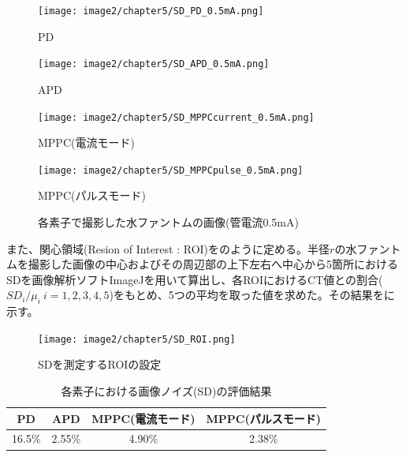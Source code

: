 \begin{figure}[H]
 \begin{minipage}{0.5\hsize}
  \begin{center}
   \texttt{[image: image2/chapter5/SD\_PD\_0.5mA.png]} 
  \end{center}
  \vspace{-1cm}
  \caption*{PD}
 \end{minipage}
 \begin{minipage}{0.5\hsize}
  \begin{center}
 \texttt{[image: image2/chapter5/SD\_APD\_0.5mA.png]} 
  \end{center}
  \vspace{-1cm}
  \caption*{APD}
 \end{minipage}
  \begin{minipage}{0.5\hsize}
  \begin{center}
 \texttt{[image: image2/chapter5/SD\_MPPCcurrent\_0.5mA.png]} 
  \end{center}
  \vspace{-1cm}
  \caption*{MPPC(電流モード)}
 \end{minipage}
  \begin{minipage}{0.5\hsize}
  \begin{center}
 \texttt{[image: image2/chapter5/SD\_MPPCpulse\_0.5mA.png]} 
  \end{center}
  \vspace{-1cm}
  \caption*{MPPC(パルスモード)}
 \end{minipage}
 \begin{center}
  \caption{各素子で撮影した水ファントムの画像(管電流0.5mA)}
  \label{fig:SD_result}
  \end{center}
\end{figure}

また、関心領域(Resion of Interest : ROI)をのように定める。半径$r$の水ファントムを撮影した画像の中心およびその周辺部の上下左右へ中心から5箇所におけるSDを画像解析ソフトImageJを用いて算出し、各ROIにおけるCT値との割合($SD_i/\mu_i\ i=1,2,3,4,5$)をもとめ、5つの平均を取った値を求めた。その結果をに示す。

\begin{figure}[H]
 \begin{center}
 \texttt{[image: image2/chapter5/SD\_ROI.png]} 
 \end{center}
 \caption{SDを測定するROIの設定}
 \label{fig:SD_ROI}
\end{figure}


\begin{table}[H]
  \centering
  \caption{各素子における画像ノイズ(SD)の評価結果}
    \begin{tabular}{cccc}
    \toprule
    PD    & APD   & MPPC(電流モード) & MPPC(パルスモード) \\
    \midrule
    16.5\% & 2.55\% & 4.90\% & 2.38\% \\
    \bottomrule
    \end{tabular}%
  \label{tab:SD_result}%
\end{table}%


